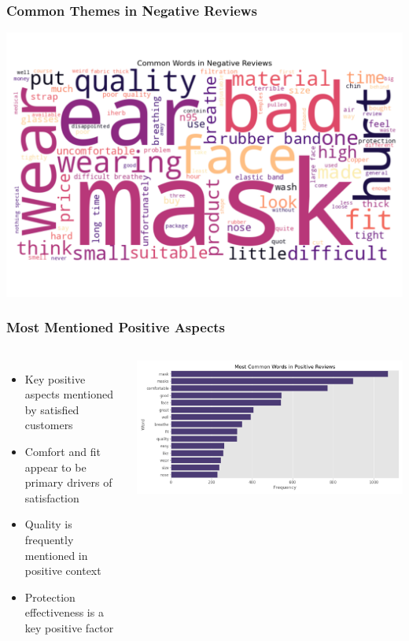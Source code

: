 \documentclass[aspectratio=169]{beamer}
\begin{document}
\begin{frame}
\frametitle{Common Themes in Negative Reviews}
\centering
\includegraphics[height=0.8\textheight]{plots/negative_reviews_wordcloud.png}
\end{frame}

\begin{frame}
\frametitle{Most Mentioned Positive Aspects}
\begin{columns}
\begin{itemize}
    \item Key positive aspects mentioned by satisfied customers
    \item Comfort and fit appear to be primary drivers of satisfaction
    \item Quality is frequently mentioned in positive context
    \item Protection effectiveness is a key positive factor
\end{itemize}
\includegraphics[width=\textwidth]{plots/common_positive_aspects.png}
\end{columns}
\end{frame}
\end{document}
